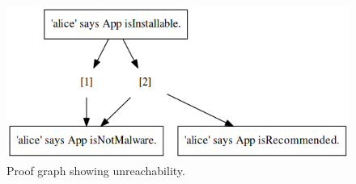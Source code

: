 \documentclass[a4paper]{scrartcl}
\begin{document}
\begin{figure}
  \centering
  \includegraphics[width=0.5\linewidth]{./figures/unreachability.png}
  \caption{Proof graph showing unreachability.}
  \label{fig:unreachability}
\end{figure}


\end{document}
